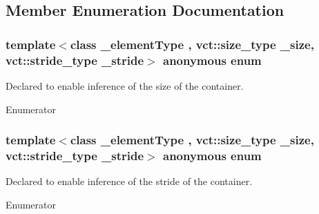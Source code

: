 \subsection{Member Enumeration Documentation}
\hypertarget{classvct_fixed_size_vector_traits_a47888b1140c58261aa5df8f3440b527e}{}\subsubsection[{anonymous enum}]{\setlength{\rightskip}{0pt plus 5cm}template$<$class \+\_\+element\+Type , vct\+::size\+\_\+type \+\_\+size, vct\+::stride\+\_\+type \+\_\+stride$>$ anonymous enum}\label{classvct_fixed_size_vector_traits_a47888b1140c58261aa5df8f3440b527e}
Declared to enable inference of the size of the container. \begin{Desc}
\item[Enumerator]\par
\begin{description}
\item[{\em 
\hypertarget{classvct_fixed_size_vector_traits_a47888b1140c58261aa5df8f3440b527eac93e9bcd3ebe92f3bc7d9f34e8a47b94}{}S\+I\+Z\+E\label{classvct_fixed_size_vector_traits_a47888b1140c58261aa5df8f3440b527eac93e9bcd3ebe92f3bc7d9f34e8a47b94}
}]\end{description}
\end{Desc}
\hypertarget{classvct_fixed_size_vector_traits_ac698cfb1928dc4e54893e2cb1f658afb}{}\subsubsection[{anonymous enum}]{\setlength{\rightskip}{0pt plus 5cm}template$<$class \+\_\+element\+Type , vct\+::size\+\_\+type \+\_\+size, vct\+::stride\+\_\+type \+\_\+stride$>$ anonymous enum}\label{classvct_fixed_size_vector_traits_ac698cfb1928dc4e54893e2cb1f658afb}
Declared to enable inference of the stride of the container. \begin{Desc}
\item[Enumerator]\par
\begin{description}
\item[{\em 
\hypertarget{classvct_fixed_size_vector_traits_ac698cfb1928dc4e54893e2cb1f658afba4be4dfff5fff04a513ed92c80f0201e9}{}S\+T\+R\+I\+D\+E\label{classvct_fixed_size_vector_traits_ac698cfb1928dc4e54893e2cb1f658afba4be4dfff5fff04a513ed92c80f0201e9}
}]\end{description}
\end{Desc}


